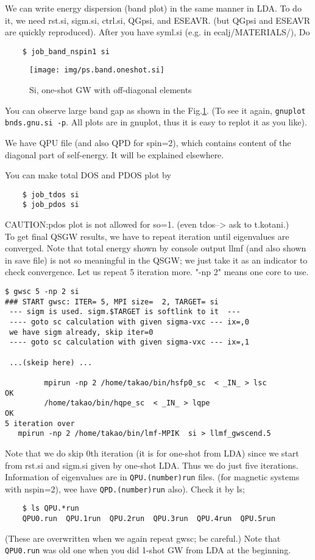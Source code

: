 \documentclass[a4paper,10pt,epsf,fleqn]{article}
\begin{document}
We can write energy dispersion (band plot) in the same manner in LDA.
To do it, we need rst.si, sigm.si, ctrl.si, QGpsi, and ESEAVR.
(but QGpsi and ESEAVR are quickly reproduced). After you have syml.si
(e.g. in ecalj/MATERIALS/), Do
\begin{verbatim}
    $ job_band_nspin1 si
\end{verbatim}

\begin{figure}[h]
 \begin{center}
  \texttt{[image: img/ps.band.oneshot.si]}
  \caption{Si, one-shot GW with off-diagonal elements}
 \end{center}
\label{sigwscone}
\end{figure}
You can observe large band gap as shown in the Fig.\ref{sigwscone}.
(To see it again, \verb+gnuplot bnds.gnu.si -p+.
All plots are in gnuplot, thus it is easy to replot it as you like).

We have QPU file (and also QPD for spin=2), which contains content
of the diagonal part of self-energy. It will be explained elsewhere.

You can make total DOS and PDOS plot by 
\begin{verbatim}
    $ job_tdos si
    $ job_pdos si
\end{verbatim}
CAUTION:pdos plot is not allowed for so=1. (even tdos--> ask to t.kotani.)\\

To get final QSGW results, we have to repeat iteration 
until eigenvalues are converged.
Note that total energy shown by console output llmf (and also shown in
save file) is not so meaningful in the QSGW; we just take it as an indicator to check convergence. 
Let us repeat 5 iteration more. "-np 2" means one core to use.
\begin{verbatim}
$ gwsc 5 -np 2 si
### START gwsc: ITER= 5, MPI size=  2, TARGET= si
 --- sigm is used. sigm.$TARGET is softlink to it  ---
 ---- goto sc calculation with given sigma-vxc --- ix=,0
 we have sigm already, skip iter=0
 ---- goto sc calculation with given sigma-vxc --- ix=,1

 ...(skeip here) ...

         mpirun -np 2 /home/takao/bin/hsfp0_sc  < _IN_ > lsc 
OK
         /home/takao/bin/hqpe_sc  < _IN_ > lqpe 
OK
5 iteration over
   mpirun -np 2 /home/takao/bin/lmf-MPIK  si > llmf_gwscend.5
\end{verbatim}
Note that we do skip 0th iteration (it is for one-shot from LDA) since
we start from rst.si and sigm.si given by one-shot LDA.
Thus we do just five iterations.
Information of eigenvalues are in \verb+QPU.(number)run+ files.
(for magnetic systems with nspin=2), wee have \verb+QPD.(number)run+ also).
Check it by ls;
\begin{verbatim}
    $ ls QPU.*run
    QPU0.run  QPU.1run  QPU.2run  QPU.3run  QPU.4run  QPU.5run
\end{verbatim}
(These are overwritten when we again repeat gwsc; be careful.)
Note that \verb+QPU0.run+ was old one when you did 1-shot GW from LDA 
at the beginning.
\end{document}
